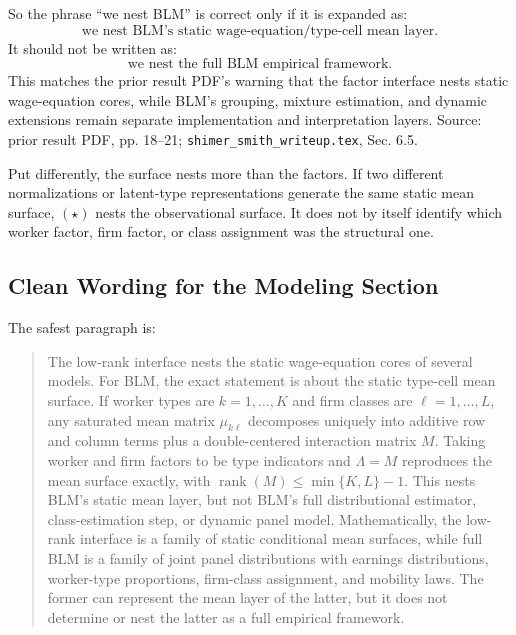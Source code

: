 ﻿\documentclass[11pt]{article}
\newcommand{\1}{\mathbf{1}}
\begin{document}
So the phrase ``we nest BLM'' is correct only if it is expanded as:
\[
\text{we nest BLM's static wage-equation/type-cell mean layer.}
\]
It should not be written as:
\[
\text{we nest the full BLM empirical framework.}
\]
This matches the prior result PDF's warning that the factor interface nests
static wage-equation cores, while BLM's grouping, mixture estimation, and dynamic
extensions remain separate implementation and interpretation layers. Source:
prior result PDF, pp. 18--21; \texttt{shimer\_smith\_writeup.tex}, Sec. 6.5.

Put differently, the surface nests more than the factors. If two different
normalizations or latent-type representations generate the same static mean
surface, $(\star)$ nests the observational surface. It does not by itself identify
which worker factor, firm factor, or class assignment was the structural one.

\subsection{Clean Wording for the Modeling Section}

The safest paragraph is:

\begin{quote}
The low-rank interface nests the static wage-equation cores of several models.
For BLM, the exact statement is about the static type-cell mean surface. If
worker types are $k=1,\ldots,K$ and firm classes are $\ell=1,\ldots,L$, any
saturated mean matrix $\mu_{k\ell}$ decomposes uniquely into additive row and
column terms plus a double-centered interaction matrix $M$. Taking worker and
firm factors to be type indicators and $\Lambda=M$ reproduces the mean surface
exactly, with $\operatorname{rank}(M)\leq\min\{K,L\}-1$. This nests BLM's static
mean layer, but not BLM's full distributional estimator, class-estimation step,
or dynamic panel model. Mathematically, the low-rank interface is a family of
static conditional mean surfaces, while full BLM is a family of joint panel
distributions with earnings distributions, worker-type proportions, firm-class
assignment, and mobility laws. The former can represent the mean layer of the
latter, but it does not determine or nest the latter as a full empirical
framework.
\end{quote}


\end{document}
